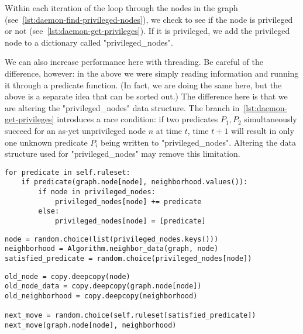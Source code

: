 Within each iteration of the loop through the nodes in the graph
  (see~\autoref{lst:daemon-find-privileged-nodes}),
  we check to see if the node is privileged or not
  (see~\autoref{lst:daemon-get-privileges}).
If it is privileged, we add the privileged node to a dictionary called "privileged_nodes".
\begin{warning}
  We can also increase performance here with threading.
  Be careful of the difference, however:
    in the above we were simply reading information and
    running it through a predicate function.
  (In fact, we are doing the same here,
    but the above is a separate idea that can be sorted out.)
  The difference here is that we are altering the "privileged_nodes" data structure.
  The branch in~\autoref{lst:daemon-get-privileges} introduces a race condition:
    if two predicates $P_1, P_2$ simultaneously succeed for
    an as-yet unprivileged node $n$ at time $t$,
    time $t+1$ will result in only one unknown predicate
    $P_i$ being written to "privileged_nodes".
  Altering the data structure used for "privileged_nodes" may remove this limitation.
\end{warning}

\begin{lstlisting}[float=p, caption={Getting the privileges of a single node.}, label={lst:daemon-get-privileges}]
for predicate in self.ruleset:
    if predicate(graph.node[node], neighborhood.values()):
        if node in privileged_nodes:
            privileged_nodes[node] += predicate
        else:
            privileged_nodes[node] = [predicate]
\end{lstlisting}

\begin{lstlisting}[float=p, caption={Picking a random, satisfied predicate.}, label={lst:daemon-pick-predicate}]
node = random.choice(list(privileged_nodes.keys()))
neighborhood = Algorithm.neighbor_data(graph, node)
satisfied_predicate = random.choice(privileged_nodes[node])
\end{lstlisting}

\begin{lstlisting}[float=p, caption={Applying a random move enabled by the satisfied predicate.}, label={lst:daemon-apply-move}]
old_node = copy.deepcopy(node)
old_node_data = copy.deepcopy(graph.node[node])
old_neighborhood = copy.deepcopy(neighborhood)

next_move = random.choice(self.ruleset[satisfied_predicate])
next_move(graph.node[node], neighborhood)
\end{lstlisting}


